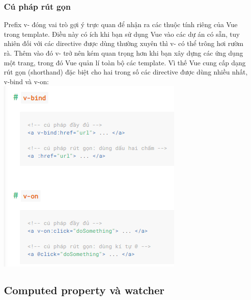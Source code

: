 \documentclass[12pt,a4paper]{report}
\begin{document}
\subsubsection{Cú pháp rút gọn}
Prefix v- đóng vai trò gợi ý trực quan để nhận ra các thuộc tính riêng của Vue trong template. Điều này có ích khi bạn sử dụng Vue vào các dự án có sẵn, tuy nhiên đối với các directive được dùng thường xuyên thì v- có thể trông hơi rườm rà. Thêm vào đó v- trở nên kém quan trọng hơn khi bạn xây dựng các ứng dụng một trang, trong đó Vue quản lí toàn bộ các template. Vì thế Vue cung cấp dạng rút gọn (shorthand) đặc biệt cho hai trong số các directive được dùng nhiều nhất, v-bind và v-on:\\
\includegraphics[scale=1]{16}
\subsection{Computed property và watcher}
\end{document}
